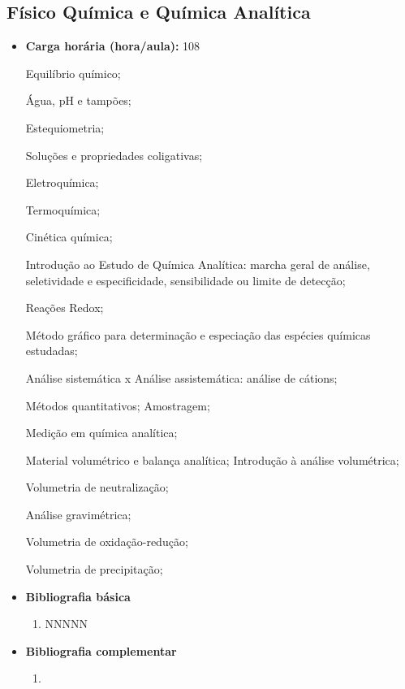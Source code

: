\documentclass[11pt,fleqn]{book} %
\begin{document}
\newpage
\subsection{Físico Química e Química Analítica}\label{disc:analitica}
\begin{itemize}
	\item \textbf{Carga horária (hora/aula):} 108
	
	Equilíbrio químico;

	Água, pH e tampões;
	
	Estequiometria; 
	
	Soluções e propriedades coligativas; 
	
	Eletroquímica;
	
	Termoquímica; 
	
	Cinética química; 
	
	Introdução ao Estudo de Química Analítica: marcha geral de análise, seletividade e especificidade, sensibilidade ou limite de detecção; 
	
	Reações Redox; 
	
	Método gráfico para determinação e especiação das espécies químicas estudadas;
	
	Análise sistemática x Análise assistemática: análise de cátions;
	
	Métodos quantitativos; Amostragem; 
	
	Medição em química analítica; 
	
	Material volumétrico e balança analítica; Introdução à análise volumétrica; 
	
	Volumetria de neutralização; 
	
	Análise gravimétrica; 
	
	Volumetria de oxidação-redução; 
	
	Volumetria de precipitação; 
	
	\item \textbf{Bibliografia básica}
	\begin{enumerate}
		\item NNNNN
	\end{enumerate}
	\item \textbf{Bibliografia complementar}
	\begin{enumerate}
		\item 
	\end{enumerate}	
\end{itemize}
\end{document}
